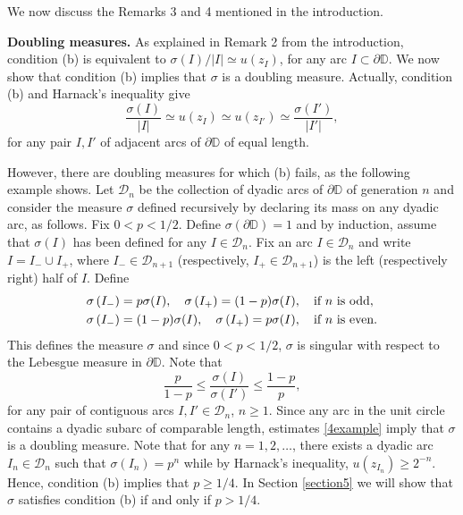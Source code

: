 \documentclass[a4paper,12pt]{article}
\theoremstyle{definition}
\numberwithin{equation}{section}
\newcommand{\D}{\mathbb D}
\begin{document}
\vspace{0.2cm}
We now discuss the Remarks 3 and 4 mentioned in the introduction.

\textbf{Doubling measures.} As explained in Remark 2 from the introduction, condition (b) is equivalent to $\sigma (I) / |I| \simeq u(z_I)$, for any arc $I \subset \partial \D$. We now show that condition (b) implies that $\sigma$ is a doubling measure. Actually, condition (b) and  Harnack's inequality give 
$$
\frac{\sigma(I)}{|I|} \simeq u(z_{I}) \simeq u (z_{I'}) \simeq \frac{\sigma (I')}{|I'|},  
$$
for any pair $I, I'$ of adjacent arcs of $\partial \D$ of equal length. 

However, there are doubling measures for which (b) fails, as the following example shows. Let $\mathcal{D}_{n} $ be the collection of dyadic arcs of $\partial \D$ of generation $n$ and consider the measure $\sigma$ defined recursively by declaring its mass on any dyadic arc, as follows. Fix $0<p<1 / 2$. Define $\sigma (\partial \D)=1$ and by induction, assume that $\sigma(I)$ has been defined for any $I \in \mathcal{D}_{n}$. Fix an arc $I \in \mathcal{D}_n$ and write $I= I_{-} \cup I_+$, where $I_{-} \in  \mathcal{D}_{n+1}$ (respectively, $ I_+ \in \mathcal{D}_{n+1}$) is the left (respectively right) half of $I$. Define
\begin{align}
    \label{1exemple}
& \sigma \left(I_{-}\right)=p \sigma (I),\quad  \sigma\left(I_{+}\right)=(1-p) \sigma (I), \quad \text{if } n \text{ is odd}, \\
& \notag \sigma \left(I_{-}\right)=(1-p) \sigma (I),\quad  \sigma\left(I_{+}\right)=p \sigma (I), \quad \text{if } n \text{ is even}. 
 \end{align}
This defines the measure $\sigma$ and since $0 < p<1 / 2$, $\sigma$ is singular with respect to the Lebesgue measure in $\partial \D$. Note that 
\begin{equation}
    \label{4example}
    \frac{p}{1-p} \leq \frac{\sigma (I)}{\sigma \left(I'\right)} \leq \frac{1-p}{p}, 
\end{equation}
for any pair of contiguous arcs $I, I' \in \mathcal{D}_{n}$, $n \geq 1$. 
Since any arc in the unit circle contains a dyadic subarc  of comparable length, estimates \eqref{4example} imply that $\sigma$ is a doubling measure. Note that for any $n=1,2, \ldots$, there exists a dyadic arc $I_{n} \in \mathcal{D}_n$ such that $\sigma\left(I_{n}\right)=p^{n}$ while by Harnack's inequality, $u( z_{I_{n}} ) \geq 2^{-n}$. Hence, condition (b) implies that $p \geq 1/ 4$. In Section \ref{section5} we will show that $\sigma$ satisfies condition (b) if and only if $p > 1/4 $. 
\end{document}
